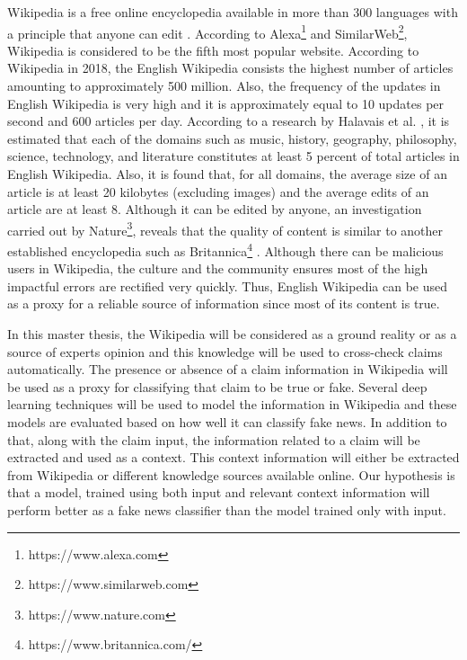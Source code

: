 \documentclass[a4paper, 11pt]{article}
\begin{document}
Wikipedia is a free online encyclopedia available in more than 300 languages with a principle that anyone can edit \cite{Wales2005}. According to Alexa\footnote{https://www.alexa.com} and SimilarWeb\footnote{https://www.similarweb.com}, Wikipedia is considered to be the fifth most popular website. According to Wikipedia in 2018, the English Wikipedia consists the highest number of articles amounting to approximately 500 million. Also, the frequency of the updates in English Wikipedia is very high and it is approximately equal to 10 updates per second and 600 articles per day. According to a research by Halavais et al. \cite{Halavais2008}, it is estimated that each of the domains such as music, history, geography, philosophy, science, technology, and literature constitutes at least 5 percent of total articles in English Wikipedia. Also, it is found that, for all domains, the average size of an article is at least 20 kilobytes (excluding images) and the average edits of an article are at least 8. Although it can be edited by anyone, an investigation carried out by Nature\footnote{https://www.nature.com}, reveals that the quality of content is similar to another established encyclopedia such as Britannica\footnote{https://www.britannica.com/} \cite{Wales2005}. Although there can be malicious users in Wikipedia, the culture and the community ensures most of the high impactful errors are rectified very quickly\cite{Priedhorsky2007}. Thus, English Wikipedia can be used as a proxy for a reliable source of information since most of its content is true.
 
In this master thesis, the Wikipedia will be considered as a ground reality or as a source of experts opinion and this knowledge will be used to cross-check claims automatically. The presence or absence of a claim information in Wikipedia will be used as a proxy for classifying that claim to be true or fake. Several deep learning techniques \cite{Goodfellow2016} will be used to model the information in Wikipedia and these models are evaluated based on how well it can classify fake news. In addition to that, along with the claim input, the information related to a claim will be extracted and used as a context. This context information will either be extracted from Wikipedia or different knowledge sources available online.\color{red} Our hypothesis is that a model, trained using both input and relevant context information will perform better as a fake news classifier than the model trained only with input.\color{black}
\end{document}
